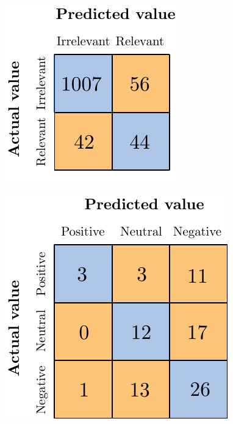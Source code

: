 \begin{figure}[H]
	\centering
	\includegraphics[scale=1]{figures/conf_matrices/ita_support/ita_rel_support_logreg_afs.pdf}
	\label{fig:ita_rel_support_logreg_afs}
\end{figure}


\begin{figure}[H]
	\centering
	\includegraphics[scale=1]{figures/conf_matrices/ita_support/ita_snt_support_bpef_afs.pdf}
	\label{fig:ita_snt_support_bpef_afs}
\end{figure}


